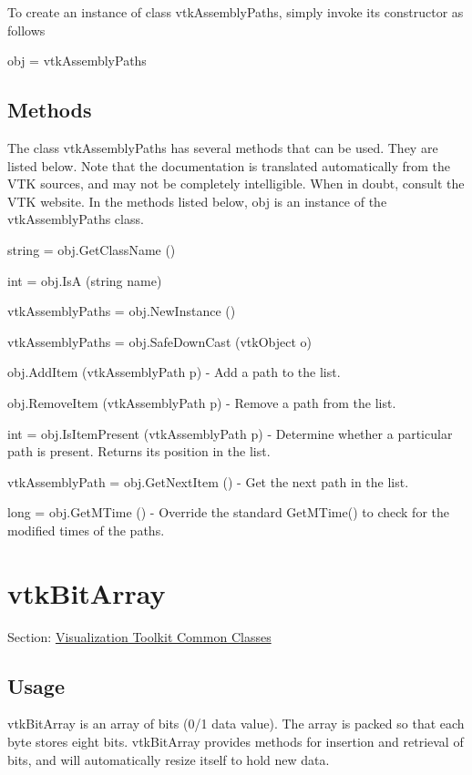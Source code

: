 To create an instance of class vtk\-Assembly\-Paths, simply invoke its constructor as follows \begin{DoxyVerb}  obj = vtkAssemblyPaths
\end{DoxyVerb}
 \hypertarget{vtkwidgets_vtkxyplotwidget_Methods}{}\subsection{Methods}\label{vtkwidgets_vtkxyplotwidget_Methods}
The class vtk\-Assembly\-Paths has several methods that can be used. They are listed below. Note that the documentation is translated automatically from the V\-T\-K sources, and may not be completely intelligible. When in doubt, consult the V\-T\-K website. In the methods listed below, {\ttfamily obj} is an instance of the vtk\-Assembly\-Paths class. 
\begin{DoxyItemize}
\item {\ttfamily string = obj.\-Get\-Class\-Name ()}  
\item {\ttfamily int = obj.\-Is\-A (string name)}  
\item {\ttfamily vtk\-Assembly\-Paths = obj.\-New\-Instance ()}  
\item {\ttfamily vtk\-Assembly\-Paths = obj.\-Safe\-Down\-Cast (vtk\-Object o)}  
\item {\ttfamily obj.\-Add\-Item (vtk\-Assembly\-Path p)} -\/ Add a path to the list.  
\item {\ttfamily obj.\-Remove\-Item (vtk\-Assembly\-Path p)} -\/ Remove a path from the list.  
\item {\ttfamily int = obj.\-Is\-Item\-Present (vtk\-Assembly\-Path p)} -\/ Determine whether a particular path is present. Returns its position in the list.  
\item {\ttfamily vtk\-Assembly\-Path = obj.\-Get\-Next\-Item ()} -\/ Get the next path in the list.  
\item {\ttfamily long = obj.\-Get\-M\-Time ()} -\/ Override the standard Get\-M\-Time() to check for the modified times of the paths.  
\end{DoxyItemize}\hypertarget{vtkcommon_vtkbitarray}{}\section{vtk\-Bit\-Array}\label{vtkcommon_vtkbitarray}
Section\-: \hyperlink{sec_vtkcommon}{Visualization Toolkit Common Classes} \hypertarget{vtkwidgets_vtkxyplotwidget_Usage}{}\subsection{Usage}\label{vtkwidgets_vtkxyplotwidget_Usage}
vtk\-Bit\-Array is an array of bits (0/1 data value). The array is packed so that each byte stores eight bits. vtk\-Bit\-Array provides methods for insertion and retrieval of bits, and will automatically resize itself to hold new data.

